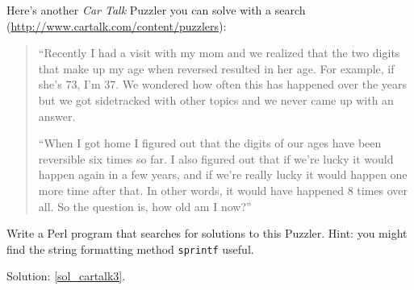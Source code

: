 \begin{exercise}
Here's another {\em Car Talk} Puzzler you can solve with a
search (\url{http://www.cartalk.com/content/puzzlers}):
\label{cartalk3}

\begin{quote}
``Recently I had a visit with my mom and we realized that
the two digits that make up my age when reversed resulted in her
age. For example, if she's 73, I'm 37. We wondered how often this has
happened over the years but we got sidetracked with other topics and
we never came up with an answer.

``When I got home I figured out that the digits of our ages have been
reversible six times so far. I also figured out that if we're lucky it
would happen again in a few years, and if we're really lucky it would
happen one more time after that. In other words, it would have
happened 8 times over all. So the question is, how old am I now?''

\end{quote}

Write a Perl program that searches for solutions to this Puzzler.
Hint: you might find the string formatting method 
{\tt sprintf} useful.

Solution: \ref{sol_cartalk3}.

\end{exercise}

